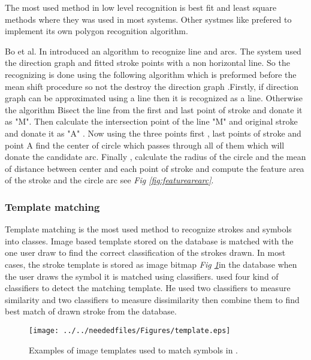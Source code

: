  
The most used method in low level recognition is best fit and least square methods where they was used in most systems. Other systmes like \cite{polygonfeedback31} prefered to implement its own polygon recognition algorithm.

Bo et al. In \cite{meanshift10} introduced an algorithm to recognize line and arcs.  The system used the direction graph and fitted stroke points with a non horizontal line. So the recognizing is done using the following algorithm which is preformed before the mean shift procedure so not the destroy the direction graph .Firstly, if direction graph can be approximated using a line then it is recognized as a line. Otherwise the algorithm Bisect the line from the first and last  point of stroke and donate it as "M". Then calculate the intersection point of the line "M" and original stroke and donate it as "A" . Now using the three points first , last points of stroke and point A find the center of circle which passes through all of them which will donate the candidate arc. Finally , calculate the radius of the circle and the mean of distance  between center and each point of stroke and  compute the feature area of the stroke and the circle arc see \textit{Fig \ref{fig:featurearearc}}.


\subsubsection{Template matching}
\label{sec:Template matching}


Template matching is the most used method to recognize strokes and symbols into classes.  Image based template stored on the database is matched with the one user draw to find the correct classification of the strokes drawn.  In most cases, the stroke template is stored as image bitmap \textit{Fig \ref{fig:template}}in the database when the user draws the symbol it is matched using classifiers. \cite {imagetrainable48,HierarchicalParsing7}  used four kind of classifiers to detect the matching template. He used two classifiers to measure similarity and two classifiers to measure dissimilarity then combine them to find best match of drawn stroke from the database.

\begin{figure}
	\centering
		\texttt{[image: ../../neededfiles/Figures/template.eps]}
	\caption[Template matching]{Examples of image templates used to match symbols in \cite{imagetrainable48}. }
	\label{fig:template}
\end{figure}

